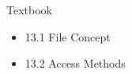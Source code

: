 \begin{slide}

	
	\inputminted{c}{f1.c}

\end{slide}

\begin{slide}

	
	\inputminted{c}{f2.c}

\end{slide}

\begin{slide}

	
	\inputminted{c}{f3_ppt.c}

\end{slide}

\begin{slide}


    Textbook 
    \begin{itemize}
        \item 13.1 File Concept
        \item 13.2 Access Methods
    \end{itemize}
\end{slide}


